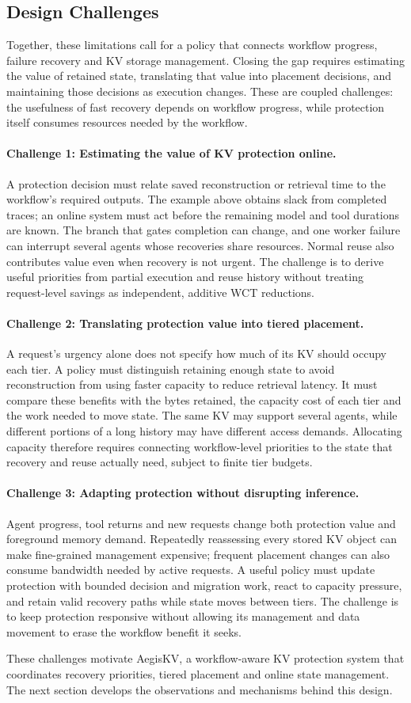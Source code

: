 \subsection{Design Challenges}
\label{sec:motivation-challenges}

Together, these limitations call for a policy that connects workflow
progress, failure recovery and KV storage management. Closing the gap
requires estimating the value of retained state, translating that value
into placement decisions, and maintaining those decisions as execution
changes. These are coupled challenges: the usefulness of fast recovery
depends on workflow progress, while protection itself consumes resources
needed by the workflow.

\paragraph{Challenge 1: Estimating the value of KV protection online.}
A protection decision must relate saved reconstruction or retrieval time
to the workflow's required outputs. The example above obtains slack from
completed traces; an online system must act before the remaining model
and tool durations are known. The branch that gates completion can
change, and one worker failure can interrupt several agents whose
recoveries share resources. Normal reuse also contributes value even
when recovery is not urgent. The challenge is to derive useful priorities
from partial execution and reuse history without treating request-level
savings as independent, additive WCT reductions.

\paragraph{Challenge 2: Translating protection value into tiered placement.}
A request's urgency alone does not specify how much of its KV should
occupy each tier. A policy must distinguish retaining enough state to
avoid reconstruction from using faster capacity to reduce retrieval
latency. It must compare these benefits with the bytes retained, the
capacity cost of each tier and the work needed to move state.
The same KV may support several agents, while different portions of a
long history may have different access demands. Allocating capacity
therefore requires connecting workflow-level priorities to the state
that recovery and reuse actually need, subject to finite tier budgets.

\paragraph{Challenge 3: Adapting protection without disrupting inference.}
Agent progress, tool returns and new requests change both protection
value and foreground memory demand. Repeatedly reassessing every stored
KV object can make fine-grained management expensive; frequent placement
changes can also consume bandwidth needed by active requests.
A useful policy must update protection with bounded decision and
migration work, react to capacity pressure, and retain valid recovery
paths while state moves between tiers. The challenge is to keep
protection responsive without allowing its management and data movement
to erase the workflow benefit it seeks.

\label{sec:motivation-goals}
These challenges motivate AegisKV, a workflow-aware KV protection system
that coordinates recovery priorities, tiered placement and online state
management. The next section develops the observations and mechanisms
behind this design.
